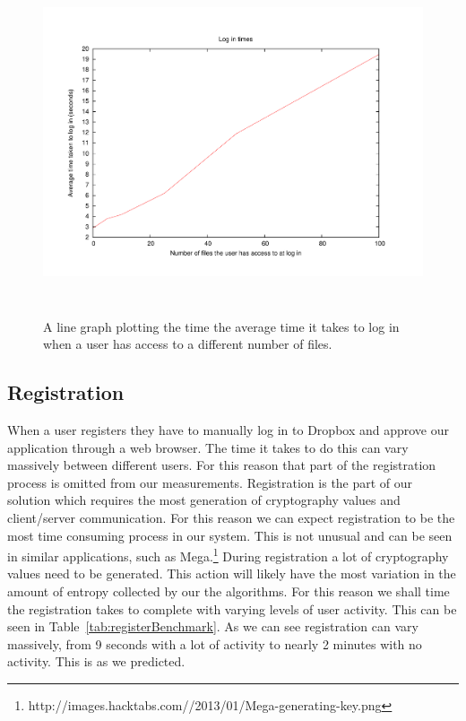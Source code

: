 \documentclass[12pt, titlepage]{article}
\begin{document}
\begin{figure}[!t]
\centerline{\includegraphics[height=4.0in,width=7in,angle=0]{plots/login/loginTimes.pdf}}
\caption{A line graph plotting the time the average time it takes to log in when a user has access to a different number of files.}
\label{fig:loginLineGraph}
\end{figure}


\subsection{Registration}
When a user registers they have to manually log in to Dropbox and approve our application through a web browser. The time it takes to do this can vary massively between different users. For this reason that part of the registration process is omitted from our measurements. 
\newline \indent Registration is the part of our solution which requires the most generation of cryptography values and client/server communication. For this reason we can expect registration to be the most time consuming process in our system. This is not unusual and can be seen in similar applications, such as Mega.\footnote{http://images.hacktabs.com//2013/01/Mega-generating-key.png}
\newline \indent During registration a lot of cryptography values need to be generated. This action will likely have the most variation in the amount of entropy collected by our the algorithms. For this reason we shall time the registration takes to complete with varying levels of user activity. This can be seen in Table~\ref{tab:registerBenchmark}. As we can see registration can vary massively, from 9 seconds with a lot of activity to nearly 2 minutes with no activity. This is as we predicted.
\end{document}
